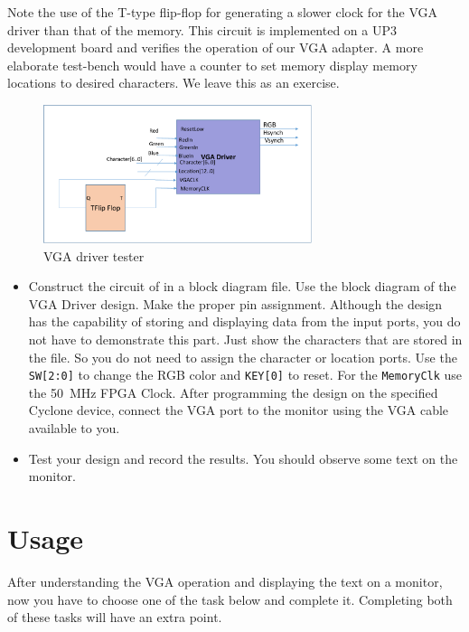 \documentclass[12pt, logo=tehranDLDL/ut]{tehranDLDL}
\begin{document}
Note the use of the T-type flip-flop for generating a slower clock for the VGA driver than that of the memory. This circuit is implemented on a UP3 development board and verifies the operation of our VGA adapter. A more elaborate test-bench would have a counter to set memory display memory locations to desired characters. We leave this as an exercise.  

\begin{figure}
    \centering
    \caption{VGA driver tester\label{fig:tester}}
    \includegraphics[width=0.7\textwidth]{tester}
\end{figure}

\begin{itemize}
    \item Construct the circuit of  in a block diagram file. Use the block diagram of the VGA Driver design. Make the proper pin assignment. Although the design has the capability of storing and displaying data from the input ports, you do not have to demonstrate this part. Just show the characters that are stored in the  file. So you do not need to assign the character or location ports. Use the \lstinline{SW[2:0]} to change the RGB color and \lstinline{KEY[0]} to reset. For the \lstinline{MemoryClk} use the \SI{50}{\mega\hertz} FPGA Clock. After programming the design on the specified Cyclone device, connect the VGA port to the monitor using the VGA cable available to you.
    \item Test your design and record the results. You should observe some text on the monitor.
\end{itemize}

\designverification{}

\section{Usage}

After understanding the VGA operation and displaying the text on a monitor, now you have to choose one of the task below and complete it. Completing both of these tasks will have an extra point.
\end{document}
